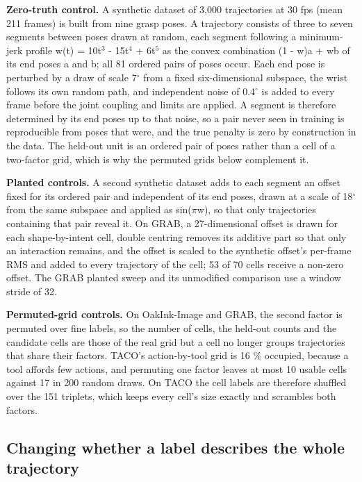 \documentclass[10pt]{article}
\begin{document}
\textbf{Zero-truth control.} A synthetic dataset of 3,000 trajectories at 30 fps (mean 211 frames) is built from nine grasp poses. A trajectory consists of three to seven segments between poses drawn at random, each segment following a minimum-jerk profile w(t) = 10t$^{3}$ - 15t$^{4}$ + 6t$^{5}$ as the convex combination (1 - w)a + wb of its end poses a and b; all 81 ordered pairs of poses occur. Each end pose is perturbed by a draw of scale 7$^\circ$ from a fixed six-dimensional subspace, the wrist follows its own random path, and independent noise of 0.4$^\circ$ is added to every frame before the joint coupling and limits are applied. A segment is therefore determined by its end poses up to that noise, so a pair never seen in training is reproducible from poses that were, and the true penalty is zero by construction in the data. The held-out unit is an ordered pair of poses rather than a cell of a two-factor grid, which is why the permuted grids below complement it.

\textbf{Planted controls.} A second synthetic dataset adds to each segment an offset fixed for its ordered pair and independent of its end poses, drawn at a scale of 18$^\circ$ from the same subspace and applied as sin($\pi$w), so that only trajectories containing that pair reveal it. On GRAB, a 27-dimensional offset is drawn for each shape-by-intent cell, double centring removes its additive part so that only an interaction remains, and the offset is scaled to the synthetic offset's per-frame RMS and added to every trajectory of the cell; 53 of 70 cells receive a non-zero offset. The GRAB planted sweep and its unmodified comparison use a window stride of 32.

\textbf{Permuted-grid controls.} On OakInk-Image and GRAB, the second factor is permuted over fine labels, so the number of cells, the held-out counts and the candidate cells are those of the real grid but a cell no longer groups trajectories that share their factors. TACO's action-by-tool grid is 16 \% occupied, because a tool affords few actions, and permuting one factor leaves at most 10 usable cells against 17 in 200 random draws. On TACO the cell labels are therefore shuffled over the 151 triplets, which keeps every cell's size exactly and scrambles both factors.

\subsection{Changing whether a label describes the whole trajectory}
\end{document}
